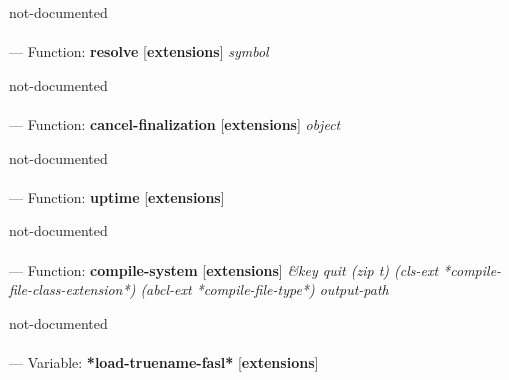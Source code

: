 \begin{adjustwidth}{5em}{5em}
not-documented
\end{adjustwidth}

\paragraph{}
\label{EXTENSIONS:RESOLVE}
--- Function: \textbf{resolve} [\textbf{extensions}] \textit{symbol}

\begin{adjustwidth}{5em}{5em}
not-documented
\end{adjustwidth}

\paragraph{}
\label{EXTENSIONS:CANCEL-FINALIZATION}
--- Function: \textbf{cancel-finalization} [\textbf{extensions}] \textit{object}

\begin{adjustwidth}{5em}{5em}
not-documented
\end{adjustwidth}

\paragraph{}
\label{EXTENSIONS:UPTIME}
--- Function: \textbf{uptime} [\textbf{extensions}] \textit{}

\begin{adjustwidth}{5em}{5em}
not-documented
\end{adjustwidth}

\paragraph{}
\label{EXTENSIONS:COMPILE-SYSTEM}
--- Function: \textbf{compile-system} [\textbf{extensions}] \textit{\&key quit (zip t) (cls-ext *compile-file-class-extension*) (abcl-ext *compile-file-type*) output-path}

\begin{adjustwidth}{5em}{5em}
not-documented
\end{adjustwidth}

\paragraph{}
\label{EXTENSIONS:*LOAD-TRUENAME-FASL*}
--- Variable: \textbf{*load-truename-fasl*} [\textbf{extensions}] \textit{}

